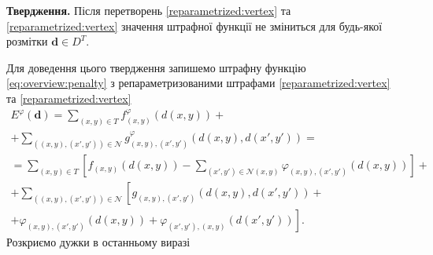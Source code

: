 \textbf{Твердження.}
Після перетворень \eqref{reparametrized:vertex} та \eqref{reparametrized:vertex}
значення штрафної функції не зміниться для будь-якої розмітки $\pmb{d} \in D^T$.

Для доведення цього твердження запишемо штрафну функцію
\eqref{eq:overview:penalty} з репараметризованими штрафами
\eqref{reparametrized:vertex} та \eqref{reparametrized:vertex}
\begin{equation*}
\begin{gathered}
    E^{\varphi} \left( \pmb{d} \right)
    = \sum \limits_{\left(x, y \right) \in T}
        f_{\left(x, y \right)}^{\varphi} \left(
            d \left(x, y \right)
        \right) + \\
    + \sum \limits_{\left(\left(x, y \right), \left(x', y'\right) \right) \in \mathcal{N}}
        g_{\left(x, y \right), \left(x', y' \right)}^{\varphi} \left(
            d \left( x, y \right), d \left( x', y' \right)
        \right) = \\
    = \sum \limits_{\left(x, y \right) \in T} \left[
        f_{\left(x, y \right)} \left( d \left(x, y \right) \right)
        - \sum \limits_{\left(x', y' \right) \in \mathcal{N} \left(x, y \right)}
            \varphi_{\left(x, y \right), \left(x', y' \right)} \left(
                d \left(x, y \right)
            \right)
        \right] + \\
        + \sum \limits_{\left(\left(x, y \right), \left(x', y'\right) \right) \in \mathcal{N}}
            \left[
                g_{\left(x, y \right), \left(x', y' \right)} \left(
                    d \left(x, y \right), d \left(x', y' \right)
                \right) + \right. \\
                \left.
                + \varphi_{\left(x, y \right), \left(x', y' \right)}
                    \left( d \left(x, y \right)
                \right)
                + \varphi_{\left(x', y' \right), \left(x, y \right)}
                    \left( d \left(x', y' \right)
                \right)
            \right].
\end{gathered}
\end{equation*}
Розкриємо дужки в останньому виразі
